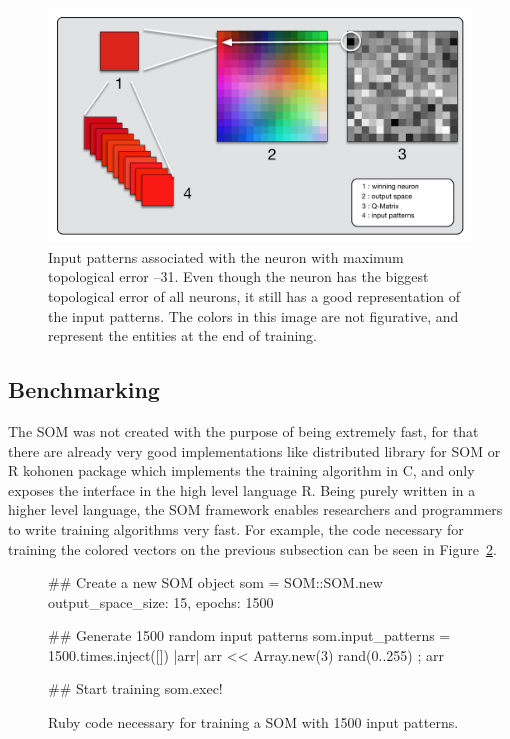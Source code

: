 \begin{figure}[h!]
  \centering
  \includegraphics[width=0.8\linewidth]{./images/som_trainned.pdf}
  \caption{Input patterns associated with the neuron with maximum topological error --31. Even though the neuron has the biggest topological error of all neurons, it still has a good representation of the input patterns. The colors in this image are not figurative, and represent the entities at the end of training.  }
  \label{fig:somtrained}
\end{figure}

\subsection{Benchmarking}
\label{sub:benchmarking}
The \ac{SOM} was not created with the purpose of being extremely fast, for that there are already very good implementations like \citet{somoclu} distributed library for \ac{SOM} or \citet{rsom} R kohonen package which implements the training algorithm in C, and only exposes the interface in the high level language R.  
Being purely written in a higher level language, the \ac{SOM} framework enables researchers and programmers to write training algorithms very fast. For example, the code necessary for training the colored vectors on the previous subsection can be seen in Figure~\ref{fig:rubysom}.

\begin{figure}[h!]
  \centering
  \begin{boxedverbatim}
  ## Create a new SOM object
  som = SOM::SOM.new output_space_size: 15, epochs: 1500

  ## Generate 1500 random input patterns
  som.input_patterns = 1500.times.inject([]){ |arr| arr << Array.new(3){ rand(0..255) }; arr  }

  ## Start training
  som.exec!
  \end{boxedverbatim}
  \caption{ Ruby code necessary for training a SOM with 1500 input patterns.  }
  \label{fig:rubysom}
\end{figure}

